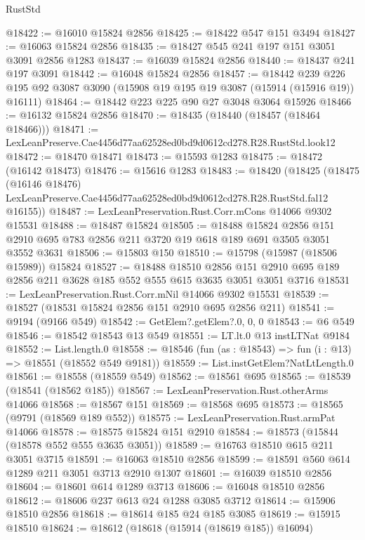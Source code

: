 \begin{lexlean}{RustStd}
\begin{coremodule}
@18422 := @16010 @15824 @2856
@18425 := @18422 @547 @151 @3494
@18427 := @16063 @15824 @2856
@18435 := @18427 @545 @241 @197 @151 @3051 @3091 @2856 @1283
@18437 := @16039 @15824 @2856
@18440 := @18437 @241 @197 @3091
@18442 := @16048 @15824 @2856
@18457 := @18442
    @239
    @226
    @195
    @92
    @3087
    @3090
    (@15908 @19 @195 @19 @3087 (@15914 (@15916 @19)) @16111)
@18464 := @18442 @223 @225 @90 @27 @3048 @3064 @15926
@18466 := @16132 @15824 @2856
@18470 := @18435 (@18440 (@18457 (@18464 @18466)))
@18471 := LexLeanPreserve.Cae4456d77aa62528ed0bd9d0612cd278.R28.RustStd.look12
@18472 := @18470 @18471
@18473 := @15593 @1283
@18475 := @18472 (@16142 @18473)
@18476 := @15616 @1283
@18483 := @18420
    (@18425
      (@18475
        (@16146 @18476)
        LexLeanPreserve.Cae4456d77aa62528ed0bd9d0612cd278.R28.RustStd.fal12
        @16155))
@18487 := LexLeanPreservation.Rust.Corr.mCons @14066 @9302 @15531
@18488 := @18487 @15824
@18505 := @18488
    @15824
    @2856
    @151
    @2910
    @695
    @783
    @2856
    @211
    @3720
    @19
    @618
    @189
    @691
    @3505
    @3051
    @3552
    @3631
@18506 := @15803 @150
@18510 := @15798 (@15987 (@18506 @15989)) @15824
@18527 := @18488
    @18510
    @2856
    @151
    @2910
    @695
    @189
    @2856
    @211
    @3628
    @185
    @552
    @555
    @615
    @3635
    @3051
    @3051
    @3716
@18531 := LexLeanPreservation.Rust.Corr.mNil @14066 @9302 @15531
@18539 := @18527 (@18531 @15824 @2856 @151 @2910 @695 @2856 @211)
@18541 := @9194 (@9166 @549)
@18542 := GetElem?.getElem?.{0, 0, 0}
@18543 := @6 @549
@18546 := @18542 @18543 @13 @549
@18551 := LT.lt.{0} @13 instLTNat @9184
@18552 := List.length.{0}
@18558 := @18546 (fun (as : @18543) => fun (i : @13) => @18551 (@18552 @549 @9181))
@18559 := List.instGetElem?NatLtLength.{0}
@18561 := @18558 (@18559 @549)
@18562 := @18561 @695
@18565 := @18539 (@18541 (@18562 @185))
@18567 := LexLeanPreservation.Rust.otherArms @14066
@18568 := @18567 @151
@18569 := @18568 @695
@18573 := @18565 (@9791 (@18569 @189 @552))
@18575 := LexLeanPreservation.Rust.armPat @14066
@18578 := @18575 @15824 @151 @2910
@18584 := @18573 (@15844 (@18578 @552 @555 @3635 @3051))
@18589 := @16763 @18510 @615 @211 @3051 @3715
@18591 := @16063 @18510 @2856
@18599 := @18591 @560 @614 @1289 @211 @3051 @3713 @2910 @1307
@18601 := @16039 @18510 @2856
@18604 := @18601 @614 @1289 @3713
@18606 := @16048 @18510 @2856
@18612 := @18606 @237 @613 @24 @1288 @3085 @3712
@18614 := @15906 @18510 @2856
@18618 := @18614 @185 @24 @185 @3085
@18619 := @15915 @18510
@18624 := @18612 (@18618 (@15914 (@18619 @185)) @16094)

\end{coremodule}
\end{lexlean}
